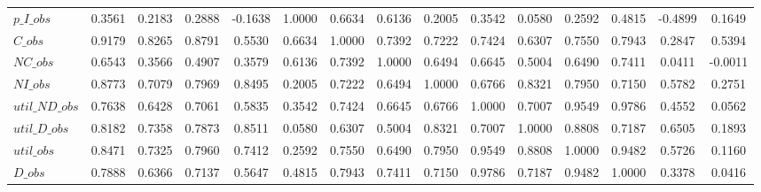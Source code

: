 \begin{center}
\begin{longtable}{lcccccccccccccc}
$p\_I\_obs      $	 & 	           0.3561	 & 	           0.2183	 & 	           0.2888	 & 	          -0.1638	 & 	           1.0000	 & 	           0.6634	 & 	           0.6136	 & 	           0.2005	 & 	           0.3542	 & 	           0.0580	 & 	           0.2592	 & 	           0.4815	 & 	          -0.4899	 & 	           0.1649 \\ 
$C\_obs         $	 & 	           0.9179	 & 	           0.8265	 & 	           0.8791	 & 	           0.5530	 & 	           0.6634	 & 	           1.0000	 & 	           0.7392	 & 	           0.7222	 & 	           0.7424	 & 	           0.6307	 & 	           0.7550	 & 	           0.7943	 & 	           0.2847	 & 	           0.5394 \\ 
$NC\_obs        $	 & 	           0.6543	 & 	           0.3566	 & 	           0.4907	 & 	           0.3579	 & 	           0.6136	 & 	           0.7392	 & 	           1.0000	 & 	           0.6494	 & 	           0.6645	 & 	           0.5004	 & 	           0.6490	 & 	           0.7411	 & 	           0.0411	 & 	          -0.0011 \\ 
$NI\_obs        $	 & 	           0.8773	 & 	           0.7079	 & 	           0.7969	 & 	           0.8495	 & 	           0.2005	 & 	           0.7222	 & 	           0.6494	 & 	           1.0000	 & 	           0.6766	 & 	           0.8321	 & 	           0.7950	 & 	           0.7150	 & 	           0.5782	 & 	           0.2751 \\ 
$util\_ND\_obs  $	 & 	           0.7638	 & 	           0.6428	 & 	           0.7061	 & 	           0.5835	 & 	           0.3542	 & 	           0.7424	 & 	           0.6645	 & 	           0.6766	 & 	           1.0000	 & 	           0.7007	 & 	           0.9549	 & 	           0.9786	 & 	           0.4552	 & 	           0.0562 \\ 
$util\_D\_obs   $	 & 	           0.8182	 & 	           0.7358	 & 	           0.7873	 & 	           0.8511	 & 	           0.0580	 & 	           0.6307	 & 	           0.5004	 & 	           0.8321	 & 	           0.7007	 & 	           1.0000	 & 	           0.8808	 & 	           0.7187	 & 	           0.6505	 & 	           0.1893 \\ 
$util\_obs      $	 & 	           0.8471	 & 	           0.7325	 & 	           0.7960	 & 	           0.7412	 & 	           0.2592	 & 	           0.7550	 & 	           0.6490	 & 	           0.7950	 & 	           0.9549	 & 	           0.8808	 & 	           1.0000	 & 	           0.9482	 & 	           0.5726	 & 	           0.1160 \\ 
$D\_obs         $	 & 	           0.7888	 & 	           0.6366	 & 	           0.7137	 & 	           0.5647	 & 	           0.4815	 & 	           0.7943	 & 	           0.7411	 & 	           0.7150	 & 	           0.9786	 & 	           0.7187	 & 	           0.9482	 & 	           1.0000	 & 	           0.3378	 & 	           0.0416 \\ 

\end{longtable}
\end{center}

